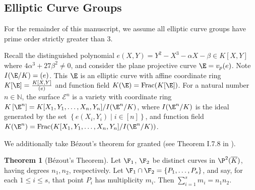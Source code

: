 \documentclass[11pt,letterpaper]{article}
\newcommand{\polys}{K[X,Y]}
\newcommand{\productpolys}{K[X_1, Y_1, \ldots, X_n, Y_n]}
\theoremstyle{definition}
\newtheorem{theorem}{Theorem}[subsection]
\newcommand{\ff}{K(\E)}
\newcommand{\6}{\mathbf}
\newcommand{\7}{\mathcal}
\begin{document}

\subsection{Elliptic Curve Groups}

For the remainder of this manuscript, we assume all elliptic curve groups have prime order strictly greater than $3$.


Recall the distinguished polynomial $e(X,Y) = Y^2 - X^3 - \alpha X - \beta \in \polys$ where $4\alpha^3 + 27\beta^2 \neq 0$, and consider the plane projective curve $\E = v_p(e)$. Note $I(\E/K) = (e)$. This $\E$ is an elliptic curve with affine coordinate ring $K[\E] = \frac{K[X,Y]}{(e)}$ and function field $K(\E) = \text{Frac}(K[\E])$. 
For a natural number $n \in \mathbb{N}$, the surface $\mathcal{E}^n$ is a variety with coordinate ring $K\left[\E^n\right] = \productpolys/I(\E^n/K)$, where $I(\E^n/K)$ is the ideal generated by the set $\left\{e(X_i, Y_i) \mid i \in [n]\right\}$, and function field $K(\E^n) = \text{Frac}(\productpolys/I(\E^n/K))$.

We additionally take B\'{e}zout's theorem for granted (see Theorem I.7.8 in \cite{Hartshorne}).
\begin{theorem}[{B}{\'{e}}zout's {T}heorem]
Let $\F_1$, $\F_2$ be distinct curves in $\P^2(\overline{K})$, having 
degrees $n_1, n_2$, respectively. Let $\F_1 \cap \F_2 = \left\{P_1, \dots, P_s\right\}$, and say, for each $1 \leq i \leq s$, that point $P_i$ has multiplicity $m_i$. Then $\sum_{i=1}^{s} m_i = n_1n_2$. 
\end{theorem}
\end{document}
